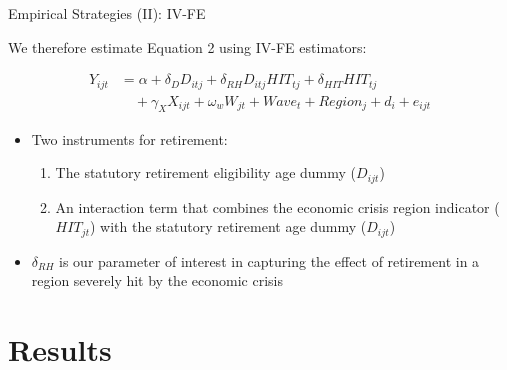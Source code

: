 \documentclass{beamer}
\begin{document}
\begin{frame}{Empirical Strategies (II): IV-FE}
\footnotesize

We therefore estimate Equation 2 using \begingroup\color{Blue}IV-FE estimators\endgroup:

\begin{equation}
\label{eq2}
\begin{aligned}
  Y_{ijt} &= \alpha + \delta_{D} D_{itj} + \delta_{RH} D_{itj}HIT_{tj} + \delta_{HIT} HIT_{tj} \\
  &\quad + \gamma_X X_{ijt} + \omega_w W_{jt} + Wave_{t} + Region_j + d_i + e_{ijt}
\end{aligned}
\end{equation}
\vspace{0.25cm}
\begin{itemize}
\scriptsize
\item  Two \begingroup\color{Blue}instruments \endgroup for retirement: 

\vspace{0.25cm}

\begin{enumerate}
\scriptsize
    \item<2-> The \begingroup\color{Blue}statutory retirement eligibility age \endgroup dummy ($D_{ijt}$)

    \vspace{0.25cm}
    
    \item<3-> An interaction term that combines the \begingroup\color{Blue}economic crisis region indicator ($HIT_{jt}$) \endgroup with the statutory retirement age dummy ($D_{ijt}$)
\end{enumerate}

\vspace{0.5cm}

\item<4-> $\delta_{RH}$ is our \begingroup\color{Blue}parameter of interest \endgroup in capturing the effect of retirement in a region severely hit by the economic crisis
\end{itemize}
\end{frame}





\section{Results}
\end{document}
